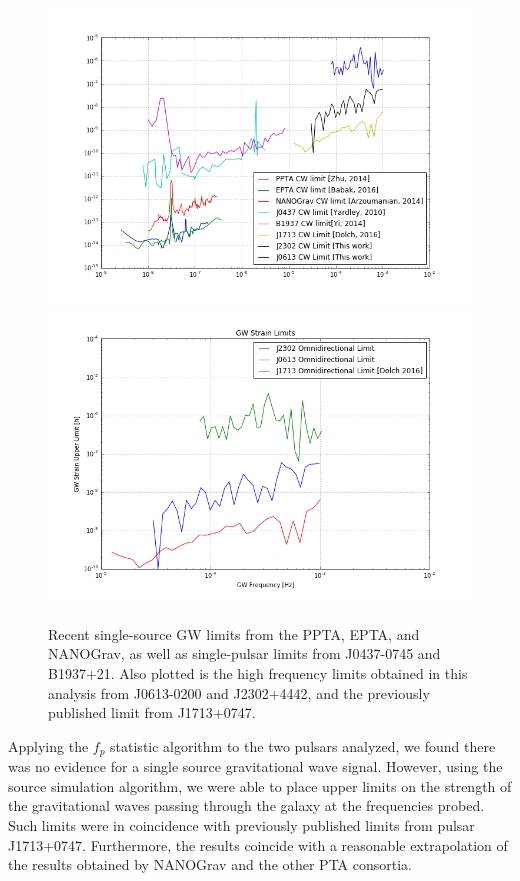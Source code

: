 \documentclass[12pt]{article}
\begin{document}
\begin{figure}
    \caption{Recent single-source GW limits from the PPTA, EPTA, and NANOGrav,
as well as single-pulsar limits from J0437-0745 and B1937+21. Also plotted is
the high frequency limits obtained in this analysis from J0613-0200 and
J2302+4442, and the previously published limit from J1713+0747.}
    \includegraphics[width=1\textwidth]{./figures/all_limits.png}
    \includegraphics[width=1\textwidth]{./figures/hf_limits.png}
\end{figure}

Applying the $f_p$ statistic algorithm to the two pulsars analyzed, we found
there was no evidence for a single source gravitational wave signal. However,
using the source simulation algorithm, we were able to place upper limits on the
strength of the gravitational waves passing through the galaxy at the
frequencies probed. Such limits were in coincidence with previously published
limits from pulsar J1713+0747. Furthermore, the results coincide with a
reasonable extrapolation of the results obtained by NANOGrav and the other PTA
consortia.
\end{document}
